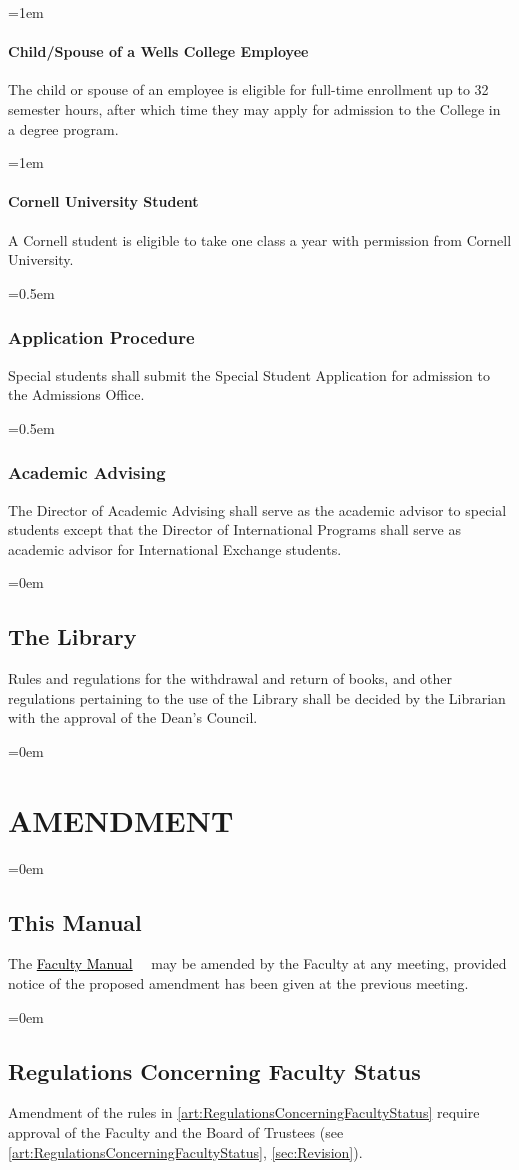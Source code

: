 \documentclass{manual}
\newcommand{\oldbreak}[1]{}
\let\stdsection\section %
\renewcommand\section{\newpage\stdsection}
\newcommand{\keyword}[1]{\textcolor{black}{#1}}
\newcommand{\facman}{\keyword{\underline{Faculty Manual}}~}
\let\oldsection\section
\renewcommand\section{\leftskip=0em\oldsection}
\let\oldsubsection\subsection
\renewcommand\subsection{\leftskip=0em\oldsubsection}
\let\oldsubsubsection\subsubsection
\renewcommand\subsubsection{\leftskip=0.5em\oldsubsubsection}
\let\oldparagraph\paragraph
\renewcommand\paragraph{\leftskip=1em\oldparagraph}
\begin{document}
\paragraph{Child/Spouse of a Wells College Employee}\label{par:spouseClasses} The child or spouse of an employee is eligible for full-time enrollment up to 32 semester hours, after which time they may apply for admission to the College in a degree program.

\paragraph{Cornell University Student} A Cornell student is eligible to take one class a year with permission from Cornell University.

\subsubsection{Application Procedure}

Special students shall submit the Special Student Application for admission to the Admissions Office.

\subsubsection{Academic Advising}

The Director of Academic Advising shall serve as the academic advisor to special students except that the Director of International Programs shall serve as academic advisor for International Exchange students. 

\oldbreak{X-2}

\subsection{The Library}

Rules and regulations for the withdrawal and return of books, and other regulations pertaining to the use of the Library shall be decided by the Librarian with the approval of the Dean's Council.

\section{AMENDMENT}\label{art:Amendment}

\subsection{This Manual}
The \facman~ may be amended by the Faculty at any meeting, provided notice of the proposed amendment has been given at the previous meeting.

\subsection{Regulations Concerning Faculty Status}
Amendment of the rules in \cref{art:RegulationsConcerningFacultyStatus} require approval of the Faculty and the Board of Trustees (see \cref{art:RegulationsConcerningFacultyStatus}, \cref{sec:Revision}).
\end{document}
